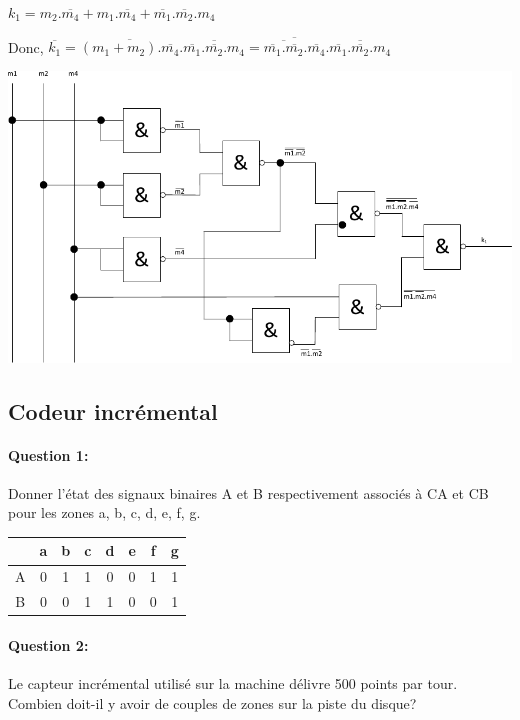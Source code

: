 $k_1=m_2.\overline{m_4}+m_1.\overline{m_4}+\overline{m_1}.\overline{m_2}.m_4$

Donc, $\overline{k_1}=\overline{(m_1+m_2).\overline{m_4}}.\overline{\overline{m_1}.\overline{m_2}.m_4}=\overline{\overline{\overline{m_1}.\overline{m_2}}.\overline{m_4}}.\overline{\overline{m_1}.\overline{m_2}.m_4}$

\begin{center}
 \includegraphics[width=0.8\linewidth]{img/nands}
\end{center}
\subsection{Codeur incrémental}

\paragraph{Question 1:} Donner l'état des signaux binaires A et B respectivement associés à CA et CB pour les zones a, b, c, d, e, f, g.

\begin{center}
\begin{tabular}{|c|c|c|c|c|c|c|c|}
\hline
  & a & b & c & d & e & f & g \\
\hline
A & 0 & 1 & 1 & 0 & 0 & 1 & 1 \\
\hline
B & 0 & 0 & 1 & 1 & 0 & 0 & 1 \\
\hline
\end{tabular}
\end{center}

\paragraph{Question 2:} Le capteur incrémental utilisé sur la machine délivre 500 points par tour. Combien doit-il y avoir de couples de zones sur la piste du disque?

